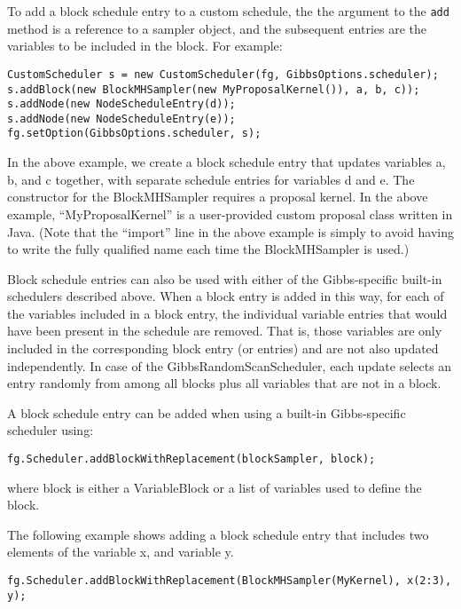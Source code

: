 \ifjava
To add a block schedule entry to a custom schedule, the the argument to the \texttt{add} method is a reference to a sampler object, and the subsequent entries are the variables to be included in the block.  For example:

\begin{lstlisting}
CustomScheduler s = new CustomScheduler(fg, GibbsOptions.scheduler);
s.addBlock(new BlockMHSampler(new MyProposalKernel()), a, b, c));
s.addNode(new NodeScheduleEntry(d));
s.addNode(new NodeScheduleEntry(e));
fg.setOption(GibbsOptions.scheduler, s);
\end{lstlisting}
\fi

In the above example, we create a block schedule entry that updates variables a, b, and c together, with separate schedule entries for variables d and e.  The constructor for the BlockMHSampler requires a proposal kernel.  In the above example, ``MyProposalKernel'' is a user-provided custom proposal class \ifmatlab written in Java\fi.  \ifmatlab (Note that the ``import'' line in the above example is simply to avoid having to write the fully qualified name each time the BlockMHSampler is used.) \fi

Block schedule entries can also be used with either of the Gibbs-specific built-in schedulers described above.  When a block entry is added in this way, for each of the variables included in a block entry, the individual variable entries that would have been present in the schedule are removed.  That is, those variables are only included in the corresponding block entry (or entries) and are not also updated independently.  In case of the GibbsRandomScanScheduler, each update selects an entry randomly from among all blocks plus all variables that are not in a block.

\ifmatlab
A block schedule entry can be added when using a built-in Gibbs-specific scheduler using:
\begin{lstlisting}
fg.Scheduler.addBlockWithReplacement(blockSampler, block);
\end{lstlisting}

where block is either a VariableBlock or a list of variables used to define the block.

The following example shows adding a block schedule entry that includes two elements of the variable x, and variable y.

\begin{lstlisting}
fg.Scheduler.addBlockWithReplacement(BlockMHSampler(MyKernel), x(2:3), y);
\end{lstlisting}


